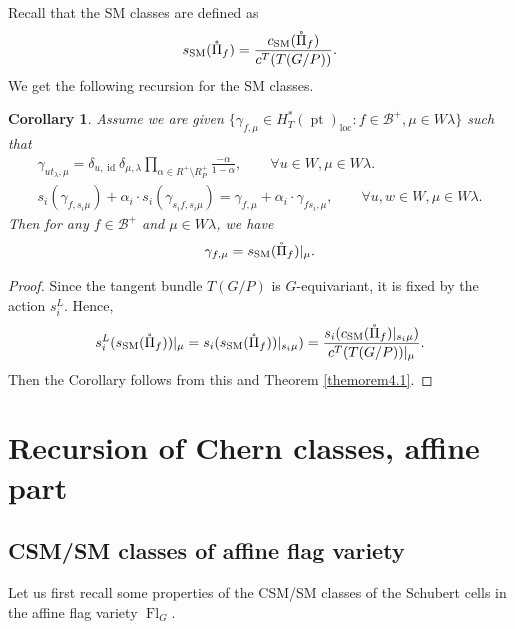 \documentclass[12pt]{amsart}
\newtheorem{Coro}[Th]{Corollary}
\def\CSM{c_{\rm SM}}
\def\SSM{s_{\rm SM}}
\def\id{\operatorname{id}}
\def\pt{\operatorname{pt}}
\def\Fl{\operatorname{Fl}}
\def\loc{\operatorname{loc}}
\begin{document}
Recall that  the SM classes are defined as  
\[\SSM(\mathring{\Pi}_f)=\frac{\CSM(\mathring{\Pi}_f)}{c^T(T(G/P))}.\] We get the following recursion for the SM classes.
\begin{Coro}\label{coro:charofSSM}
Assume we are given 
$\{\gamma_{f,\mu}\in H_T^*(\pt)_{\loc}: f\in \mathcal{B}^+,\mu\in W\lambda\}$
such that 
\begin{gather}
\label{eq:SSMPRchar1}
\gamma_{ut_\lambda,\mu}=\delta_{u,\id}\delta_{\mu,\lambda}
\prod\nolimits_{\alpha\in R^+\setminus R_P^+}
\frac{-\alpha}{1-\alpha},
\qquad \forall u\in W,\mu\in W\lambda.
\\
\label{eq:SSMPRchar2}
s_i(\gamma_{f,s_i\mu})
+\alpha_i\cdot s_i(\gamma_{s_if,s_i\mu})
= \gamma_{f,\mu}
+\alpha_i\cdot \gamma_{fs_i,\mu},
\qquad \forall u,w\in W,\mu\in W\lambda.
\end{gather}
Then for any $f\in \mathcal{B}^+$ and $\mu\in W\lambda$, we have 
$$\gamma_{f,\mu}=\SSM(\mathring{\Pi}_f)|_\mu.$$
\end{Coro}
\begin{proof}
    Since the tangent bundle $T(G/P)$ is $G$-equivariant, it is fixed by the action $s_i^L$. Hence,
    \[s_i^L(\SSM(\mathring{\Pi}_f))|_\mu=s_i(\SSM(\mathring{\Pi}_f))|_{s_i\mu})=\frac{s_i(\CSM(\mathring{\Pi}_f)|_{s_i\mu})}{c^T(T(G/P))|_\mu}.\]
    Then the Corollary follows from this and   Theorem \ref{themorem4.1}.
\end{proof}











\section{Recursion of Chern classes, affine part}\label{affinepart}


\subsection{CSM/SM classes of affine flag variety}
Let us first recall some properties of the CSM/SM classes of the Schubert cells in the affine flag variety $\Fl_G$. 
\end{document}
